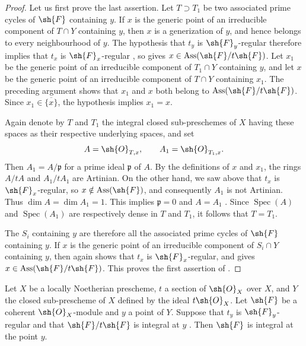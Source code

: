 \begin{proof}
Let us first prove the last assertion.
Let $T\supset T_1$ be two associated prime cycles of $\sh{F}$ containing $y$.
If $x$ is the generic point of an irreducible component of $T\cap Y$ containing $y$, then $x$ is a generization of $y$, and hence belongs to every neighbourhood of $y$.
The hypothesis that $t_y$ is $\sh{F}_y$-regular therefore implies that $t_x$ is $\sh{F}_x$-regular , so  gives $x\in\operatorname{Ass}(\sh{F}/t\sh{F})$.
Let $x_1$ be the generic point of an irreducible component of $T_1\cap Y$ containing $y$, and let $x$ be the generic point of an irreducible component of $T\cap Y$ containing $x_1$.
The preceding argument shows that $x_1$ and $x$ both belong to $\operatorname{Ass}(\sh{F}/t\sh{F})$.
Since $x_1\in\overline{\{x\}}$, the hypothesis implies $x_1=x$.

Again denote by $T$ and $T_1$ the integral closed sub-preschemes of $X$ having these spaces as their respective underlying spaces, and set
\[
A=\sh{O}_{T,x},
\qquad
A_1=\sh{O}_{T_1,x}.
\]
Then $A_1=A/\mathfrak p$ for a prime ideal $\mathfrak p$ of $A$.
By the definitions of $x$ and $x_1$, the rings $A/tA$ and $A_1/tA_1$ are Artinian.
On the other hand, we saw above that $t_x$ is $\sh{F}_x$-regular, so $x\notin\operatorname{Ass}(\sh{F})$, and consequently $A_1$ is not Artinian.
Thus $\dim A=\dim A_1=1$.
This implies $\mathfrak p=0$ and $A=A_1$ .
Since $\operatorname{Spec}(A)$ and $\operatorname{Spec}(A_1)$ are respectively dense in $T$ and $T_1$, it follows that $T=T_1$.

The $S_i$ containing $y$ are therefore all the associated prime cycles of $\sh{F}$ containing $y$.
If $x$ is the generic point of an irreducible component of $S_i\cap Y$ containing $y$, then  again shows that $t_x$ is $\sh{F}_x$-regular, and  gives $x\in\operatorname{Ass}(\sh{F}/t\sh{F})$.
This proves the first assertion of .
\end{proof}

\begin{proposition}[3.4.5]
\label{IV.3.4.5}
Let $X$ be a locally Noetherian prescheme, $t$ a section of $\sh{O}_X$ over $X$, and $Y$ the closed sub-prescheme of $X$ defined by the ideal $t\sh{O}_X$.
Let $\sh{F}$ be a coherent $\sh{O}_X$-module and $y$ a point of $Y$.
Suppose that $t_y$ is $\sh{F}_y$-regular and that $\sh{F}/t\sh{F}$ is integral at $y$ .
Then $\sh{F}$ is integral at the point $y$.
\end{proposition}

